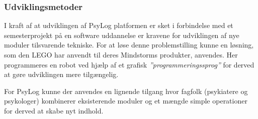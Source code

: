 \subsubsection{Udviklingsmetoder}
I kraft af at udviklingen af PsyLog platformen er sket i forbindelse med et semesterprojekt på en software uddannelse er kravene for udviklingen af nye moduler tilsvarende tekniske.
For at løse denne problemstilling kunne en løsning, som den LEGO har anvendt til deres Mindstorms produkter, anvendes.
Her programmeres en robot ved hjælp af et grafisk \textit{''programmeringssprog''} for derved at gøre udviklingen mere tilgængelig.

For PsyLog kunne der anvendes en lignende tilgang hvor fagfolk (psykiatere og psykologer) kombinerer eksisterende moduler og et mængde simple operationer for derved at skabe nyt indhold.